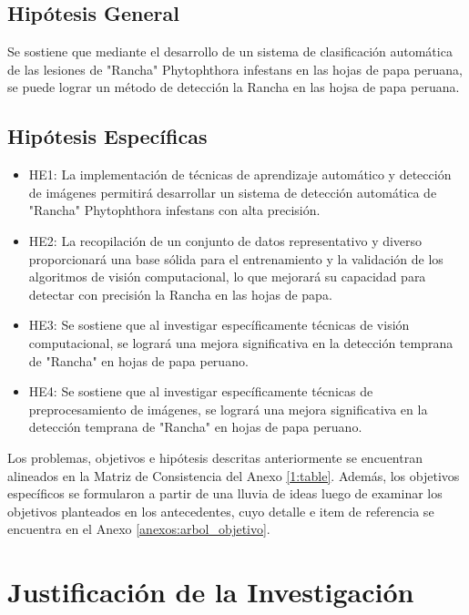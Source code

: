 \subsection{Hipótesis General}
 \newcommand{\HipotesisGeneral}{
	Se sostiene que mediante el desarrollo de un sistema de clasificación automática de las lesiones de "Rancha" Phytophthora infestans en las hojas de papa peruana, se puede lograr un método de detección la Rancha en las hojsa de papa peruana.
	}
\HipotesisGeneral

\subsection{Hipótesis Específicas}
\newcommand{\Hone}{
La implementación de técnicas de aprendizaje automático y detección de imágenes permitirá desarrollar un sistema de detección automática de "Rancha" Phytophthora infestans con alta precisión.
}
\newcommand{\Htwo}{
La recopilación de un conjunto de datos representativo y diverso proporcionará una base sólida para el entrenamiento y la validación de los algoritmos de visión computacional, lo que mejorará su capacidad para detectar con precisión la Rancha en las hojas de papa.
}
\newcommand{\Hthree}{
Se sostiene que al investigar específicamente técnicas de visión computacional, se logrará una mejora significativa en la detección temprana de "Rancha" en hojas de papa peruano.
}
\newcommand{\Hfour}{
Se sostiene que al investigar específicamente técnicas de preprocesamiento de imágenes, se logrará una mejora significativa en la detección temprana de "Rancha" en hojas de papa peruano.
}

\begin{itemize}
	\item HE1: \Hone
	\item HE2: \Htwo
	\item HE3: \Hthree
	\item HE4: \Hfour
\end{itemize}

Los problemas, objetivos e hipótesis descritas anteriormente se encuentran alineados en la Matriz de Consistencia del Anexo \ref{1:table}. Además, los objetivos específicos se formularon a partir de una lluvia de ideas luego de examinar los objetivos planteados en los antecedentes, cuyo detalle e item de referencia se encuentra en el Anexo \ref{anexos:arbol_objetivo}.

\section{Justificación de la Investigación}

